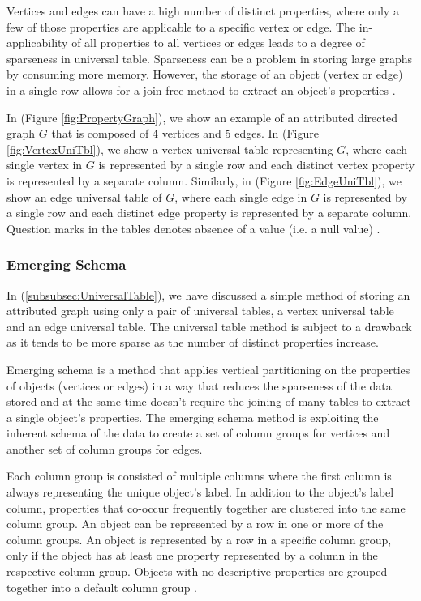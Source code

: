{Vertices and edges can have a high number of distinct properties, where only a few of those properties are applicable to a specific vertex or edge. The in-applicability of all properties to all vertices or edges leads to a degree of sparseness in universal table. Sparseness can be a problem in storing large graphs by consuming more memory. However, the storage of an object (vertex or edge) in a single row allows for a join-free method to extract an object's properties \cite{Paradies2017}.

In (Figure \ref{fig:PropertyGraph}), we show an example of an attributed directed graph $G$ that is composed of 4 vertices and 5 edges. In (Figure \ref{fig:VertexUniTbl}), we show a vertex universal table representing $G$, where each single vertex in $G$ is represented by a single row and each distinct vertex property is represented by a separate column. Similarly, in (Figure \ref{fig:EdgeUniTbl}), we show an edge universal table of $G$, where each single edge in $G$ is represented by a single row and each distinct edge property is represented by a separate column. Question marks in the tables denotes absence of a value (i.e. a null value) \cite{Paradies2017}.


\subsubsection{Emerging Schema}
\label{subsubsec:EmergingSchema}

In (\ref{subsubsec:UniversalTable}), we have discussed a simple method of storing an attributed graph using only a pair of universal tables, a vertex universal table and an edge universal table. The universal table method is subject to a drawback as it tends to be more sparse as the number of distinct properties increase.

Emerging schema is a method that applies vertical partitioning on the properties of objects (vertices or edges) in a way that reduces the sparseness of the data stored and at the same time doesn't require the joining of many tables to extract a single object's properties. The emerging schema method is exploiting the inherent schema of the data to create a set of column groups for vertices and another set of column groups for edges. 

Each column group is consisted of multiple columns where the first column is always representing the unique object's label. In addition to the object's label column, properties that co-occur frequently together are clustered into the same column group. An object can be represented by a row in one or more of the column groups. An object is represented by a row in a specific column group, only if the object has at least one property represented by a column in the respective column group. Objects with no descriptive properties are grouped together into a default column group \cite{Paradies2017}.

}
